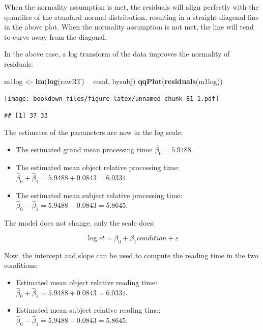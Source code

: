 \documentclass[12pt,]{krantz}
\newenvironment{Shaded}{\begin{snugshade}}{\end{snugshade}}
\newcommand{\KeywordTok}[1]{\textcolor[rgb]{0.13,0.29,0.53}{\textbf{#1}}}
\newcommand{\NormalTok}[1]{#1}
\newcommand{\OperatorTok}[1]{\textcolor[rgb]{0.81,0.36,0.00}{\textbf{#1}}}
\newcommand{\StringTok}[1]{\textcolor[rgb]{0.31,0.60,0.02}{#1}}
\providecommand{\tightlist}{%
  \setlength{\itemsep}{0pt}\setlength{\parskip}{0pt}}
\begin{document}
When the normality assumption is met, the residuals will align perfectly with the quantiles of the standard normal distribution, resulting in a straight diagonal line in the above plot. When the normality assumption is not met, the line will tend to curve away from the diagonal.

In the above case, a log transform of the data improves the normality of residuals:

\begin{Shaded}
\begin{Highlighting}[]
\NormalTok{m1log <-}\StringTok{ }\KeywordTok{lm}\NormalTok{(}\KeywordTok{log}\NormalTok{(rawRT) }\OperatorTok{~}\StringTok{ }\NormalTok{cond, bysubj)}
\KeywordTok{qqPlot}\NormalTok{(}\KeywordTok{residuals}\NormalTok{(m1log))}
\end{Highlighting}
\end{Shaded}

\texttt{[image: bookdown\_files/figure-latex/unnamed-chunk-81-1.pdf]}

\begin{verbatim}
## [1] 37 33
\end{verbatim}

The estimates of the parameters are now in the log scale:

\begin{itemize}
\tightlist
\item
  The estimated grand mean processing time: \(\hat\beta_0=5.9488\).
\item
  The estimated mean object relative processing time: \(\hat\beta_0+\hat\beta_1=5.9488+0.0843=6.0331\).
\item
  The estimated mean subject relative processing time: \(\hat\beta_0-\hat\beta_1=5.9488-0.0843=5.8645\).
\end{itemize}

The model does not change, only the scale does:

\begin{equation}
\log rt = \beta_0 + \beta_1 condition  + \varepsilon 
\end{equation}

Now, the intercept and slope can be used to compute the reading time in the two conditions:

\begin{itemize}
\tightlist
\item
  Estimated mean object relative reading time: \(\hat\beta_0+\hat\beta_1=5.9488+0.0843=6.0331\).
\item
  Estimated mean subject relative reading time: \(\hat\beta_0-\hat\beta_1=5.9488-0.0843=5.8645\).
\end{itemize}
\end{document}
